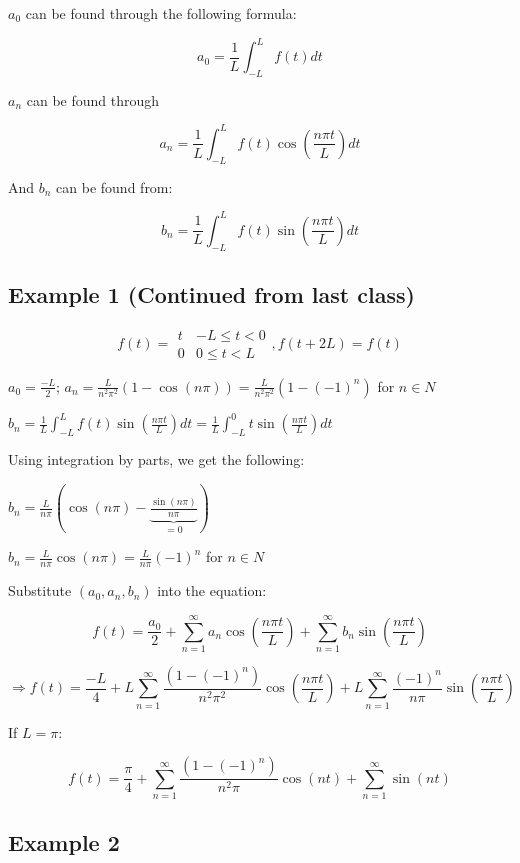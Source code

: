 $a_0$ can be found through the following formula:

$$a_0 = \frac{1}{L} \int_{-L}^L f(t) dt$$

$a_n$ can be found through

$$a_n = \frac{1}{L} \int_{-L}^{L} f(t) \cos(\frac{n \pi t}{L}) dt$$

And $b_n$ can be found from:

$$b_n = \frac{1}{L} \int_{-L}^L f(t) \sin(\frac{n \pi t}{L}) dt$$

\subsection{Example 1 (Continued from last class)}

$$f(t) = \begin{matrix} t & -L \leq t < 0 \\ 0 & 0 \leq t < L \end{matrix}, f(t + 2L) = f(t)$$

$a_0 = \frac{-L}{2}$; $a_n = \frac{L}{n^2 \pi^2} \left(1 - \cos(n \pi ) \right) = \frac{L}{n^2 \pi^2} \left(1 - (-1)^n \right)$ for $n \in {N}$

\hfill

$b_n = \frac{1}{L} \int_{-L}^L f(t) \sin(\frac{n \pi t}{L}) dt =  \frac{1}{L} \int_{-L}^0 t \sin(\frac{n \pi t}{L}) dt$

Using integration by parts, we get the following:

$b_n = \left. \frac{L}{n \pi}\left( \cos(n \pi) - \underbrace{\frac{\sin(n \pi)}{n \pi}}_{ = 0} \right) \right.$

$b_n = \frac{L}{n \pi} \cos(n \pi) = \frac{L}{n \pi} (-1)^n$ for $n \in N$

Substitute $(a_0, a_n, b_n)$ into the equation: 

$$f(t) = \frac{a_0}{2} + \sum_{n = 1}^\infty a_n \cos(\frac{n \pi t}{L}) + \sum_{n = 1}^\infty b_n \sin(\frac{n \pi t}{L})$$

$$\Rightarrow f(t) = \frac{-L}{4} + L \sum_{n = 1}^\infty \frac{(1 - (-1)^n)}{n^2 \pi^2} \cos(\frac{n \pi t}{L}) +  L \sum_{n = 1}^\infty \frac{(-1)^n}{n \pi} \sin(\frac{n \pi t}{L})$$

If $L = \pi$:

$$f(t) = \frac{\pi}{4} + \sum_{n = 1}^\infty \frac{(1-  (-1)^n)}{n^2 \pi} \cos(n t) + \sum_{n = 1}^\infty \sin(n t)$$

\subsection{Example 2}

